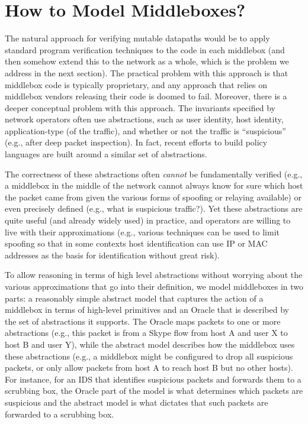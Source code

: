 \section{How to Model Middleboxes?}
\label{sec:mbmodel}
The natural approach for verifying mutable datapaths would be to apply standard program verification techniques to the code in each middlebox (and then somehow extend this to the network as a whole, which is the problem we address in the next section). The practical problem with this approach is that middlebox code is typically proprietary, and any approach that relies on middlebox vendors releasing their code is doomed to fail.
Moreover, there is a deeper conceptual problem with this approach. The invariants specified by network operators often use abstractions, such as user identity, host identity, application-type (of the traffic), and whether or not the traffic is ``suspicious'' (e.g., after deep packet inspection). In fact, recent efforts to build policy languages are built around a similar set of abstractions.

The correctness of these abstractions often {\em cannot} be fundamentally verified (e.g., a middlebox in the middle of the network cannot always know for sure which host the packet came from given the various forms of spoofing or relaying available) or even precisely defined (e.g., what is suspicious traffic?). Yet these abstractions are quite useful (and already widely used) in practice, and operators are willing to live with their approximations (e.g., various techniques can be used to limit spoofing so that in some contexts host identification can use IP or MAC addresses as the basis for identification without great risk).

To allow reasoning in terms of high level abstractions without worrying about the various approximations that go into their definition, we model middleboxes in two parts: a reasonably simple abstract model that captures the action of a middlebox in terms of high-level primitives and an Oracle that is described by the set of abstractions it supports. The Oracle maps packets to one or more abstractions (e.g., this packet is from a Skype flow from host A and user X to host B and user Y), while the abstract model describes how the middlebox uses these abstractions (e.g., a middlebox might be configured to drop all suspicious packets, or only allow packets from host A to reach host B but no other hosts). For instance, for an IDS that identifies suspicious packets and forwards them to a scrubbing box, the Oracle part of the model is what determines which packets are suspicious and the abstract model is what dictates that such packets are forwarded to a scrubbing box.

